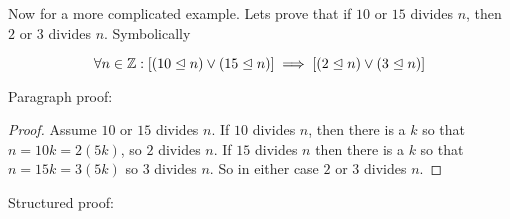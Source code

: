 \begin{example}
	Now for a more complicated example.  Lets prove that if $10$ or $15$ divides $n$, then $2$ or $3$ divides $n$. Symbolically 
	
	\[
	\forall n \in \mathbb{Z}: [(10 \trianglelefteq n) \vee (15 \trianglelefteq n)] \implies [(2 \trianglelefteq n) \vee (3 \trianglelefteq n)]
	\]
	
	Paragraph proof:
	
	\begin{proof}
			Assume $10$ or $15$ divides $n$.  If $10$ divides $n$, then there is a $k$ so that $n=10k = 2(5k)$, so $2$ divides $n$.  If $15$ divides $n$ then there is a $k$ so that $n=15k=3(5k)$ so $3$ divides $n$.  So in either case $2$ or $3$ divides $n$.
		\end{proof}
	
Structured proof:


\end{example}
